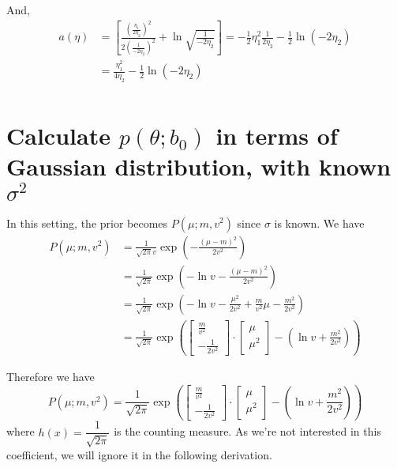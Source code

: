 \documentclass[12pt]{article}
\begin{document}
And,
\begin{align*}
  a(\eta) & =\left[\frac{\left(\frac{\eta_1}{2\eta_2}\right)^2}{2\left(\frac{1}{-2\eta_2}\right)^2}+\ln\sqrt{\frac{1}{-2\eta_2}}\right]=-\frac{1}{2}\eta_1^2\frac{1}{2\eta_2}-\frac{1}{2}\ln\left(-2\eta_2\right) \\
          & =\frac{\eta_1^2}{4\eta_2}-\frac{1}{2}\ln\left(-2\eta_2\right)                                                                                                                                         \\
\end{align*}

\newpage
\section*{Calculate $p(\theta;b_0)$ in terms of Gaussian distribution, with known $\sigma^2$}

In this setting, the prior becomes $P\left( \mu;m,v^2 \right)$ since $\sigma$ is known. We have
\begin{align*}
  P\left( \mu;m,v^2 \right) & =\frac{1}{\sqrt{2\pi}v}\exp\left( -\frac{(\mu-m)^2}{2v^2} \right)                                                                      \\
                            & =\frac{1}{\sqrt{2\pi}}\exp\left( -\ln v-\frac{(\mu-m)^2}{2v^2} \right)                                                                 \\
                            & =\frac{1}{\sqrt{2\pi}}\exp\left( -\ln v-\frac{\mu^2}{2v^2}+\frac{m}{v^2}\mu-\frac{m^2}{2v^2} \right)                                   \\
                            & =\frac{1}{\sqrt{2\pi}}\exp\left( \begin{bmatrix}
      \frac{m}{v^2} \\-\frac{1}{2v^2}
    \end{bmatrix}\cdot\begin{bmatrix}
      \mu \\\mu^2
    \end{bmatrix}-\left( \ln v+\frac{m^2}{2v^2} \right) \right)
\end{align*}

Therefore we have \[P\left( \mu;m,v^2 \right)=\frac{1}{\sqrt{2\pi}}\exp\left( \begin{bmatrix}
      \frac{m}{v^2} \\-\frac{1}{2v^2}
    \end{bmatrix}\cdot\begin{bmatrix}
      \mu \\\mu^2
    \end{bmatrix}-\left( \ln v+\frac{m^2}{2v^2} \right) \right)\]
where $h(x)=\dfrac{1}{\sqrt{2\pi}}$ is the counting measure. As we're not interested in this coefficient, we will ignore it in the following derivation.
\end{document}
